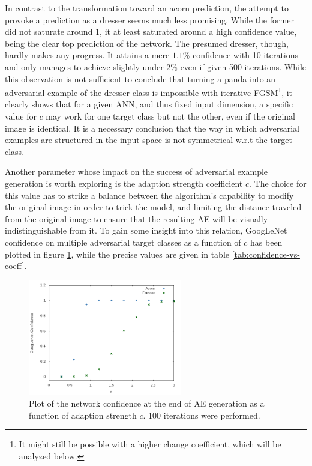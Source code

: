\documentclass[11pt, a4paper]{article}
\begin{document}
In contrast to the transformation toward an acorn prediction, the attempt to provoke a prediction as a dresser seems much less promising. While the former did not saturate around 1, it at least saturated around a high confidence value, being the clear top prediction of the network. The presumed dresser, though, hardly makes any progress. It attains a mere $1.1\%$ confidence with 10 iterations and only manages to achieve slightly under $2\%$ even if given 500 iterations. While this observation is not sufficient to conclude that turning a panda into an adversarial example of the dresser class is impossible with iterative FGSM\footnote{It might still be possible with a higher change coefficient, which will be analyzed below.}, it clearly shows that for a given ANN, and thus fixed input dimension, a specific value for $c$ may work for one target class but not the other, even if the original image is identical. It is a necessary conclusion that the way in which adversarial examples are structured in the input space is not symmetrical w.r.t the target class.

Another parameter whose impact on the success of adversarial example generation is worth exploring is the adaption strength coefficient $c$. The choice for this value has to strike a balance between the algorithm's capability to modify the original image in order to trick the model, and limiting the distance traveled from the original image to ensure that the resulting AE will be visually indistinguishable from it. To gain some insight into this relation, GoogLeNet confidence on multiple adversarial target classes as a function of $c$ has been plotted in figure \ref{fig:confidence-vs-coeff}, while the precise values are given in table \ref{tab:confidence-vs-coeff}.

\begin{figure}[h!tb]
	\centering
	\includegraphics[width=0.6\textwidth]{images/confidence-vs-coeff.png}
	\caption[Final network confidence w.r.t adaption strength coefficient]{Plot of the network confidence at the end of AE generation as a function of adaption strength $c$. 100 iterations were performed.}
	\label{fig:confidence-vs-coeff}
\end{figure}
\end{document}
